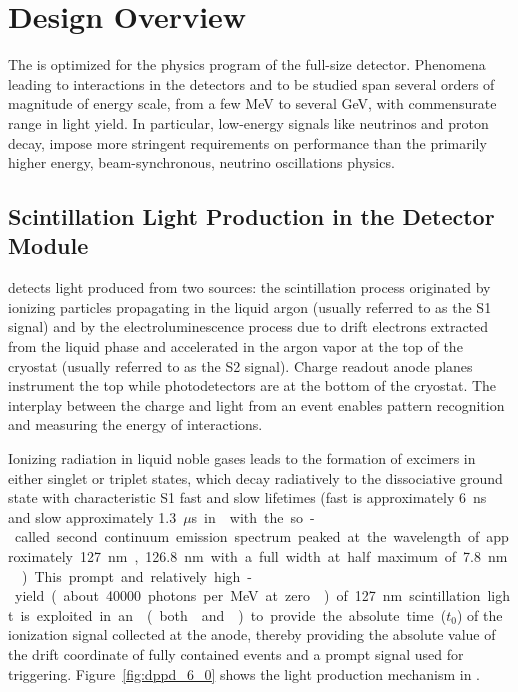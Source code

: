 \section{Design Overview}
\label{sec:dp-pds-overview}

The \dual {} is optimized for the physics program of the full-size \dune \dual detector. Phenomena leading to interactions in the  detectors and to be studied span several orders of magnitude of energy scale, from a few \si{MeV} to several \si{GeV}, with commensurate range in light yield. In particular, low-energy signals like  neutrinos and proton decay, impose more stringent requirements on  performance than the primarily higher energy, beam-synchronous, neutrino oscillations physics.



\subsection{Scintillation Light Production in the \dual Detector Module}
\label{sec:dp-pds-overview_scintillation}

\dual {} detects light produced from two sources: the scintillation process originated by ionizing particles propagating in the liquid argon (usually referred to as the S1 signal) and by the electroluminescence process due to drift electrons extracted from the liquid phase and accelerated in the argon vapor at the top of the cryostat (usually referred to as the S2 signal). Charge readout anode planes instrument the top while photodetectors are at the bottom of the cryostat. The interplay between the charge and light from an event enables pattern recognition and measuring the energy of interactions.

Ionizing radiation in liquid noble gases leads to the formation of excimers in either singlet or triplet states, which decay radiatively to the dissociative ground state with characteristic S1 fast and slow lifetimes (fast is approximately \SI{6}{ns} and slow approximately \SI{1.3}{$\mu$s} in \lar with the so-called second continuum emission spectrum peaked at the wavelength of approximately \SI{127}{nm}, \SI{126.8}{nm} with a full width at half maximum of \SI{7.8}{nm} \cite{Heindl}). This prompt and relatively high-yield (about \num{40000} photons per \si{MeV} at zero \efield) of \SI{127}{nm} scintillation light is exploited in an \lartpc (both  and ) to provide the absolute time ($t_0$) of the ionization signal collected at the anode, thereby providing the absolute value of the drift coordinate of fully contained events and a prompt signal used for triggering. Figure~\ref{fig:dppd_6_0} shows the light production mechanism in \lar.

